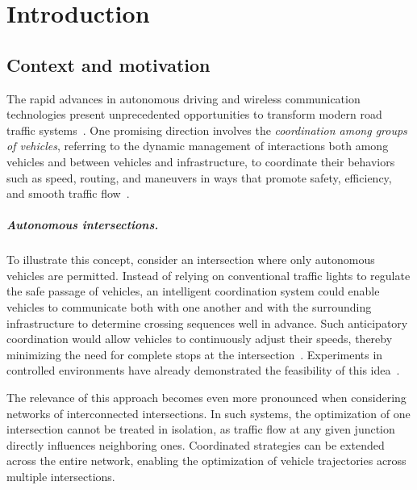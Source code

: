 \documentclass{report}
\theoremstyle{definition}
\theoremstyle{plain}
\begin{document}
\chapter{Introduction}\label{chap:introduction}

\section{Context and motivation}

The rapid advances in autonomous driving and wireless communication technologies
present unprecedented opportunities to transform modern road traffic systems~\cite{padmajaExplorationIssuesChallenges2023}.
One promising direction involves the \emph{coordination among groups of
vehicles}, referring to the dynamic management of interactions both among
vehicles and between vehicles and infrastructure, to coordinate their behaviors such
as speed, routing, and maneuvers in ways that promote safety, efficiency, and
smooth traffic flow~\cite{marianiCoordinationAutonomousVehicles2022}.

\paragraph{Autonomous intersections.}

To illustrate this concept, consider an intersection where only autonomous
vehicles are permitted. Instead of relying on conventional traffic lights to
regulate the safe passage of vehicles, an intelligent coordination system could
enable vehicles to communicate both with one another and with the surrounding
infrastructure to determine crossing sequences well in
advance.
Such anticipatory coordination would allow vehicles to continuously adjust their
speeds, thereby minimizing the need for complete stops at the intersection~\cite{dresnerMultiagentApproachAutonomous2008,khayatianSurveyIntersectionManagement2020,guoUrbanTrafficSignal2019}.
Experiments in controlled environments have already demonstrated the feasibility
of this
idea~\cite{khayatianCrossroadsTimeawareApproach2020,hultOptimalCoordinationThree}.

The relevance of this approach becomes even more pronounced when considering
networks of interconnected intersections. In such systems, the optimization of
one intersection cannot be treated in isolation, as traffic flow at any given
junction directly influences neighboring ones. Coordinated strategies can be
extended across the entire network, enabling the optimization of vehicle
trajectories across multiple intersections.
\end{document}
